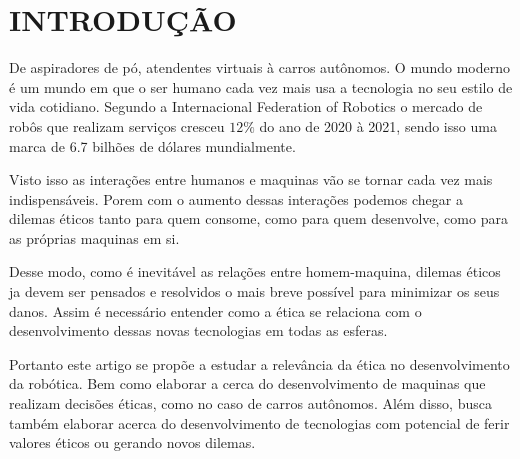\section{INTRODUÇÃO}

De aspiradores de pó, atendentes virtuais à carros autônomos. O mundo moderno é um mundo em que o ser humano cada vez mais usa a tecnologia no seu estilo de vida cotidiano. Segundo a Internacional Federation of Robotics \cite{WorldRob:online} o mercado de robôs que realizam serviços cresceu $12 \%$ do ano de 2020 à 2021, sendo isso uma marca de 6.7 bilhões de dólares mundialmente.

Visto isso as interações entre humanos e maquinas vão se tornar cada vez mais indispensáveis. Porem com o aumento dessas interações podemos chegar a dilemas éticos tanto para quem consome, como para quem desenvolve, como para as próprias maquinas em si.

Desse modo, como é inevitável as relações entre homem-maquina, dilemas éticos ja devem ser pensados e resolvidos o mais breve possível para minimizar os seus danos. Assim é necessário entender como a ética se relaciona com o desenvolvimento dessas novas tecnologias em todas as esferas.

Portanto este artigo se propõe a estudar a relevância da ética no desenvolvimento da robótica. Bem como elaborar a cerca do desenvolvimento de maquinas que realizam decisões éticas, como no caso de carros autônomos. Além disso, busca também elaborar acerca do desenvolvimento de tecnologias com potencial de ferir valores éticos ou gerando novos dilemas.